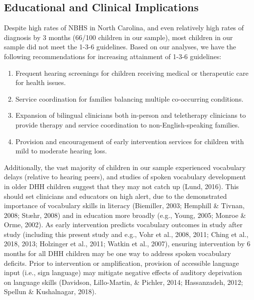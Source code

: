 \documentclass[
  english,
  man]{apa6}
\begin{document}
\hypertarget{educational-and-clinical-implications}{%
\subsection{Educational and Clinical Implications}\label{educational-and-clinical-implications}}

Despite high rates of NBHS in North Carolina, and even relatively high rates of diagnosis by 3 months (66/100 children in our sample), most children in our sample did not meet the 1-3-6 guidelines. Based on our analyses, we have the following recommendations for increasing attainment of 1-3-6 guidelines:

\begin{enumerate}

\item Frequent hearing screenings for children receiving medical or therapeutic care for health issues.
\item Service coordination for families balancing multiple co-occurring conditions.
\item Expansion of bilingual clinicians both in-person and teletherapy clinicians to provide therapy and service coordination to non-English-speaking families.
\item Provision and encouragement of early intervention services for children with mild to moderate hearing loss.

\end{enumerate}

Additionally, the vast majority of children in our sample experienced vocabulary delays (relative to hearing peers), and studies of spoken vocabulary development in older DHH children suggest that they may not catch up (Lund, 2016). This should set clinicians and educators on high alert, due to the demonstrated importance of vocabulary skills in literacy (Biemiller, 2003; Hemphill \& Tivnan, 2008; Stæhr, 2008) and in education more broadly (e.g., Young, 2005; Monroe \& Orme, 2002). As early intervention predicts vocabulary outcomes in study after study (including this present study and e.g., Vohr et al., 2008, 2011; Ching et al., 2018, 2013; Holzinger et al., 2011; Watkin et al., 2007), ensuring intervention by 6 months for all DHH children may be one way to address spoken vocabulary deficits. Prior to intervention or amplification, provision of accessible language input (i.e., sign language) may mitigate negative effects of auditory deprivation on language skills (Davidson, Lillo-Martin, \& Pichler, 2014; Hassanzadeh, 2012; Spellun \& Kushalnagar, 2018).
\end{document}
